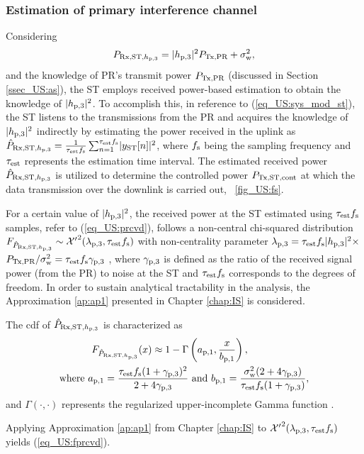 \subsubsection{Estimation of primary interference channel} 
Considering
\begin{equation}
P_{\text{Rx,ST,$h_{\text{p,3}}$}} = |h_{\text{p,3}}|^2 P_{\text{Tx,PR}} + \sigma^2_{\text{w}} \label{eq_US:prcvd}, 
\end{equation}
and the knowledge of PR's transmit power $P_{\text{Tx,PR}}$ (discussed in Section  \ref{ssec_US:as}), the ST employs received power-based estimation to obtain the knowledge of $|h_{\text{p,3}}|^2$. To accomplish this, in reference to (\ref{eq_US:sys_mod_st}), the ST listens to the transmissions from the PR and acquires the knowledge of $|h_{\text{p,3}}|^2$ indirectly by estimating the power received in the uplink as $\hat{P}_{\text{Rx,ST,$h_{\text{p,3}}$}} = {\frac{1}{{\tau_{\text{est}} f_{\text{s}}}}\sum_{n=1}^{\tau_{\text{est}} f_{\text{s}}}} {|y_{\text{ST}}[n]|^2}$, where $f_{\text{s}}$ being the sampling frequency and $\tau_{\text{est}}$ represents the estimation time interval. 
The estimated received power $\hat{P}_{\text{Rx,ST,$h_{\text{p,3}}$}}$ is utilized to determine the controlled power $P_{\text{Tx,ST,cont}}$ at which the data transmission over the downlink is carried out, \figurename~\ref{fig_US:fs}. 


For a certain value of $|h_{\text{p,3}}|^2$, the received power at the ST estimated using $\tau_{\text{est}} f_{\text{s}}$ samples, refer to (\ref{eq_US:prcvd}), follows a non-central chi-squared distribution $\fprcvdstpr \sim \ncchi2(\lpth, \test \fsam)$ with non-centrality parameter $\lambda_{\text{p,3}} = \tau_{\text{est}} f_{\text{s}} |h_{\text{p,3}}|^2 \times$ $P_{\text{Tx,PR}} /\sigma^2_{\text{w}} = \tau_{\text{est}} f_{\text{s}} {\gamma}_{\text{p,3}}$ \cite{Kay}, where ${\gamma}_{\text{p,3}}$ is defined as the ratio of the received signal power (from the PR) to noise at the ST and $\tau_{\text{est}} f_{\text{s}}$ corresponds to the degrees of freedom. In order to sustain analytical tractability in the analysis, the Approximation \ref{ap:ap1} presented in Chapter \ref{chap:IS} is considered. 
\begin{lemma} \label{lm_US:lm1}
\normalfont
The cdf of $\hat{P}_{\text{Rx,ST,$h_{\text{p,3}}$}}$ is characterized as 
\begin{align}
F_{\hat{P}_{\text{Rx,ST,$h_{\text{p,3}}$}}}(x) \approx 1 - \Gamma&\left(a_{\text{p,1}}, \frac{x}{b_{\text{p,1}}}\right) \label{eq_US:fprcvd}, \\ 
\text{where  } a_{\text{p,1}} = \frac{\tau_{\text{est}} f_{\text{s}} (1 + {\gamma}_{\text{p,3}})^2}{2 + 4 {\gamma}_{\text{p,3}}} &\text{ and } b_{\text{p,1}} = \frac{\sigma^2_{\text{w}} (2 + 4 {\gamma}_{\text{p,3}})}{\tau_{\text{est}} f_{\text{s}} (1 + {\gamma}_{\text{p,3}})},  \label{eq_US:para_po} 
\end{align} 
and $\Gamma(\cdot, \cdot)$ represents the regularized upper-incomplete Gamma function \cite{abramo}. 
\end{lemma}
\begin{IEEEproof}[Solution]
Applying Approximation \ref{ap:ap1} from Chapter \ref{chap:IS} to $\ncchi2(\lpth, \test \fsam)$ yields (\ref{eq_US:fprcvd}). 
\end{IEEEproof}


